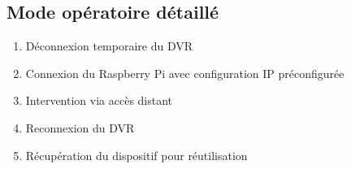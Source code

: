 \documentclass{UTT-Books-44}
\begin{document}
\subsection{Mode opératoire détaillé}
\begin{enumerate}
\item Déconnexion temporaire du DVR
\item Connexion du Raspberry Pi avec configuration IP préconfigurée
\item Intervention via accès distant
\item Reconnexion du DVR
\item Récupération du dispositif pour réutilisation
\end{enumerate}
\end{document}
